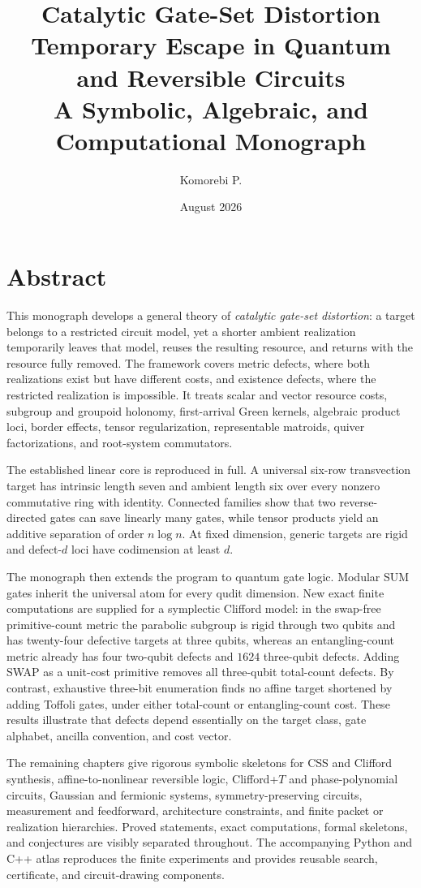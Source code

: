 \documentclass[11pt,openany]{book}
\title{\Huge Catalytic Gate-Set Distortion\\[0.5em]
\Large Temporary Escape in Quantum and Reversible Circuits\\[1em]
\large A Symbolic, Algebraic, and Computational Monograph}
\author{Komorebi P.}
\date{August 2026}
\numberwithin{equation}{chapter}
\theoremstyle{definition}
\theoremstyle{remark}
\begin{document}
\frontmatter
\maketitle

\chapter*{Abstract}
This monograph develops a general theory of \emph{catalytic gate-set distortion}: a target belongs to a restricted circuit model, yet a shorter ambient realization temporarily leaves that model, reuses the resulting resource, and returns with the resource fully removed.  The framework covers metric defects, where both realizations exist but have different costs, and existence defects, where the restricted realization is impossible.  It treats scalar and vector resource costs, subgroup and groupoid holonomy, first-arrival Green kernels, algebraic product loci, border effects, tensor regularization, representable matroids, quiver factorizations, and root-system commutators.

The established linear core is reproduced in full.  A universal six-row transvection target has intrinsic length seven and ambient length six over every nonzero commutative ring with identity.  Connected families show that two reverse-directed gates can save linearly many gates, while tensor products yield an additive separation of order $n\log n$.  At fixed dimension, generic targets are rigid and defect-$d$ loci have codimension at least $d$.

The monograph then extends the program to quantum gate logic.  Modular SUM gates inherit the universal atom for every qudit dimension.  New exact finite computations are supplied for a symplectic Clifford model: in the swap-free primitive-count metric the parabolic subgroup is rigid through two qubits and has twenty-four defective targets at three qubits, whereas an entangling-count metric already has four two-qubit defects and $1624$ three-qubit defects.  Adding SWAP as a unit-cost primitive removes all three-qubit total-count defects.  By contrast, exhaustive three-bit enumeration finds no affine target shortened by adding Toffoli gates, under either total-count or entangling-count cost.  These results illustrate that defects depend essentially on the target class, gate alphabet, ancilla convention, and cost vector.

The remaining chapters give rigorous symbolic skeletons for CSS and Clifford synthesis, affine-to-nonlinear reversible logic, Clifford+$T$ and phase-polynomial circuits, Gaussian and fermionic systems, symmetry-preserving circuits, measurement and feedforward, architecture constraints, and finite packet or realization hierarchies.  Proved statements, exact computations, formal skeletons, and conjectures are visibly separated throughout.  The accompanying Python and C++ atlas reproduces the finite experiments and provides reusable search, certificate, and circuit-drawing components.
\end{document}
